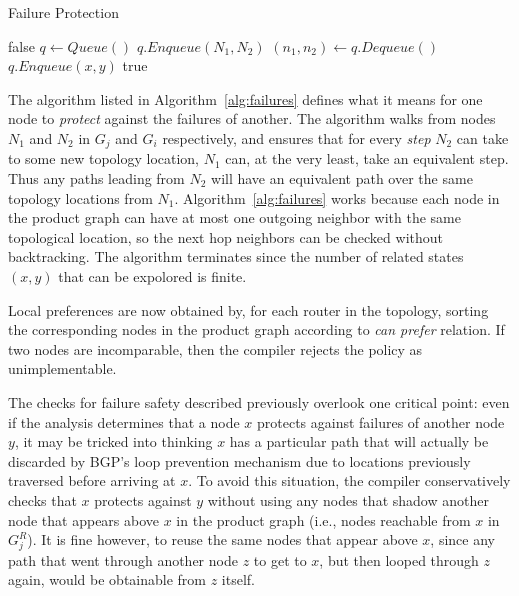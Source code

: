 \begin{algorithm}[t!]
\caption{Failure Protection}
\label{alg:failures}
\begin{algorithmic}[1]
   \Return false
  \EndIf
  \State $q \gets Queue()$
  \State $q.Enqueue (N_1, N_2)$
    \State $(n_1,n_2) \gets q.Dequeue()$
          \State $q.Enqueue(x,y)$
        \EndIf
      \EndIf
    \EndFor
  \EndWhile
  \Return true
  \EndProcedure
\end{algorithmic}
\end{algorithm}

The algorithm listed in Algorithm~\ref{alg:failures} defines what it means for one node to \textit{protect} against the failures of another. The algorithm walks from nodes $N_1$ and $N_2$ in $G_j$ and $G_i$ respectively, and ensures that for every \textit{step} $N_2$ can take to some new topology location, $N_1$ can, at the very least, take an equivalent step. Thus any paths leading from $N_2$ will have an equivalent path over the same topology locations from $N_1$. Algorithm~\ref{alg:failures} works because each node in the product graph can have at most one outgoing neighbor with the same topological location, so the next hop neighbors can be checked without backtracking. The algorithm terminates since the number of related states $(x,y)$ that can be expolored is finite.

Local preferences are now obtained by, for each router in the topology, sorting the corresponding nodes in the product graph according to \textit{can prefer} relation. If two nodes are incomparable, then the compiler rejects the policy as unimplementable.


The checks for failure safety described previously overlook one critical point: even if the analysis determines that a node $x$ protects against failures of another node $y$, it may be tricked into thinking $x$ has a particular path that will actually be discarded by BGP's loop prevention mechanism due to locations previously traversed before arriving at $x$. To avoid this situation, the compiler conservatively checks that $x$ protects against $y$ without using any nodes that shadow another node that appears above $x$ in the product graph (i.e., nodes reachable from $x$ in $G_j^R$). It is fine however, to reuse the same nodes that appear above $x$, since any path that went through another node $z$ to get to $x$, but then looped through $z$ again, would be obtainable from $z$ itself.


